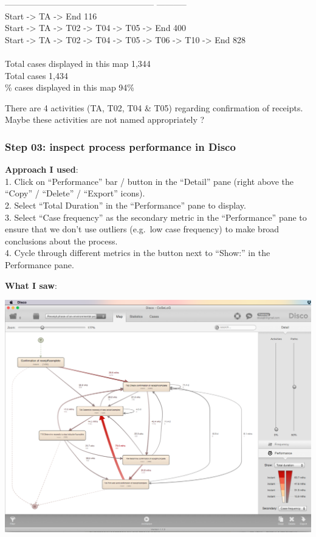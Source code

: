 \documentclass[]{article}
\begin{document}
----------------------------------------------------- \textbar{}
-----------\\ Start -\textgreater{} TA -\textgreater{} End \textbar{}
116\\ Start -\textgreater{} TA -\textgreater{} T02 -\textgreater{} T04
-\textgreater{} T05 -\textgreater{} End \textbar{} 400\\Start
-\textgreater{} TA -\textgreater{} T02 -\textgreater{} T04
-\textgreater{} T05 -\textgreater{} T06 -\textgreater{} T10
-\textgreater{} End \textbar{} 828\\ \textbar{}\\ Total cases displayed
in this map \textbar{} 1,344\\ Total cases \textbar{} 1,434\\ \% cases
displayed in this map \textbar{} 94\%

There are 4 activities (TA, T02, T04 \& T05) regarding confirmation of
receipts. Maybe these activities are not named appropriately ?

\subsubsection{Step 03: inspect process performance in
Disco}\label{step-03-inspect-process-performance-in-disco}

\textbf{Approach I used}:\\1. Click on ``Performance'' bar / button in
the ``Detail'' pane (right above the ``Copy'' / ``Delete'' / ``Export''
icons).\\2. Select ``Total Duration'' in the ``Performance'' pane to
display.\\3. Select ``Case frequency'' as the secondary metric in the
``Performance'' pane to ensure that we don't use outliers (e.g.~low case
frequency) to make broad conclusions about the process.\\4. Cycle
through different metrics in the button next to ``Show:'' in the
Performance pane.

\textbf{What I saw}:

\includegraphics{CoSeLoG_Step_03.png}
\end{document}
